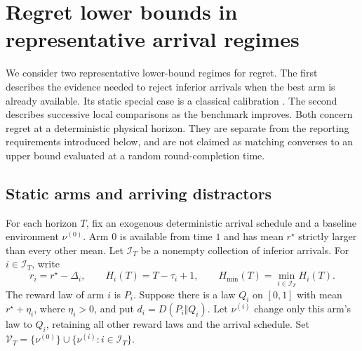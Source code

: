 \documentclass[11pt]{article}
\begin{document}
\section{Regret lower bounds in representative arrival regimes}
\label{sec:retained_regret_lower_bounds}

We consider two representative lower-bound regimes for regret.
The first describes the evidence needed to reject inferior arrivals when
the best arm is already available. Its static special case is a classical
calibration \citep{LAI19854,BurnetasKatehakis1996}. The second describes
successive local comparisons as the benchmark improves. Both concern regret
at a deterministic physical horizon. They are separate from the reporting
requirements introduced below, and are not claimed as matching converses to
an upper bound evaluated at a random round-completion time.

\subsection{Static arms and arriving distractors}

For each horizon $T$, fix an exogenous deterministic arrival schedule and a
baseline environment $\nu^{(0)}$. Arm $0$ is available from time $1$ and has
mean $r^\star$ strictly larger than every other mean. Let $\mathcal I_T$ be
a nonempty collection of inferior arrivals. For $i\in\mathcal I_T$, write
\[
 r_i=r^\star-\Delta_i,\qquad
 H_i(T)=T-\tau_i+1,\qquad
 H_{\min}(T)=\min_{i\in\mathcal I_T}H_i(T).
\]
The reward law of arm $i$ is $P_i$. Suppose there is a law $Q_i$ on $[0,1]$
with mean $r^\star+\eta_i$, where $\eta_i>0$, and put
$d_i=D(P_i\Vert Q_i)$. Let $\nu^{(i)}$ change only this arm's law to $Q_i$,
retaining all other reward laws and the arrival schedule. Set
$\mathcal V_T=\{\nu^{(0)}\}\cup\{\nu^{(i)}:i\in\mathcal I_T\}$.
\end{document}
